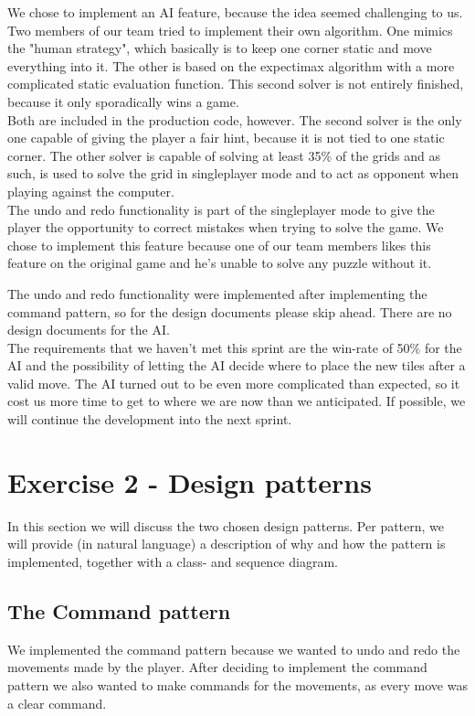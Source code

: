 \documentclass[a4paper,11pt,report]{scrartcl}
\begin{document}
We chose to implement an AI feature, because the idea seemed challenging to us.
Two members of our team tried to implement their own algorithm. One mimics the
"human strategy", which basically is to keep one corner static and move
everything into it. The other is based on the expectimax algorithm with a more
complicated static evaluation function. This second solver is not entirely
finished, because it only sporadically wins a game.\\

Both are included in the production code, however. The second solver is the only
one capable of giving the player a fair hint, because it is not tied to one
static corner. The other solver is capable of solving at least 35\% of the grids
and as such, is used to solve the grid in singleplayer mode and to act as
opponent when playing against the computer.\\

The undo and redo functionality is part of the singleplayer mode to give the
player the opportunity to correct mistakes when trying to solve the game. We
chose to implement this feature because one of our team members likes this
feature on the original game and he's unable to solve any puzzle without it.

The undo and redo functionality were implemented after implementing the command
pattern, so for the design documents please skip ahead. There are no design
documents for the AI.\\

The requirements that we haven't met this sprint are the win-rate of 50\% for
the AI and the possibility of letting the AI decide where to place the new tiles
after a valid move. The AI turned out to be even more complicated than expected,
so it cost us more time to get to where we are now than we anticipated. If
possible, we will continue the development into the next sprint.

\newpage\section{Exercise 2 - Design patterns}
In this section we will discuss the two chosen design patterns. Per pattern,
we will provide (in natural language) a description of why and how the pattern
is implemented, together with a class- and sequence diagram.

\subsection{The Command pattern}
We implemented the command pattern because we wanted to undo and redo the movements made by the player. After deciding to implement the command pattern we also wanted to make commands for the movements, as every move was a clear command.
\end{document}
